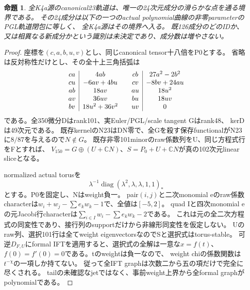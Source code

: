 \documentclass[a4paper,11pt]{ltjsarticle}
\newtheorem{proposition}{命題}[section]
\theoremstyle{definition}
\begin{document}
\begin{proposition}\label{prop:plane-concurrent-m3-K4a-smooth24-parent}
全K4a源のcanonical23軌道は、唯一の24次元成分の滑らかな点を通る境界である。
その24成分は以下の一つのactual polynomial曲線の非零parameterのPGL軌道閉包に等しく、
全K4a源はその境界へ入る。
既126成分のどのIDか、又は相異なる新成分かという識別は未決定であり、成分数は増やさない。
\end{proposition}
\begin{proof}
座標を$(c,a,b,u,v)$とし、同じcanonical tensor十八倍をP0とする。
省略は反対称性だけとし、その全十上三角括弧は
\[
\begin{array}{c|c@{\qquad}c|c}
 ca&4ab&cb&27a^2-2b^2\\
 cu&-6av+4bu&cv&-8bv+24au\\
 ab&18av&au&18u^2\\
 av&36uv&bu&18uv\\
 bv&18u^2+36v^2&uv&0
\end{array}
\]
である。全350微分Dはrank101、実Euler/PGL/scale tangent Gはrank48、
kerDは49次元である。
既存kernelのN23はDN零で、全Gを殺す保存functionalがN23に$8/87$を与えるので$N\notin G$。
既存非零101minorのraw係数列をU、同じ方程式行をFとすれば、
$V_{150}=G\oplus(U+\mathbb CN)$、$S=P_0+U+\mathbb CN$が真の102次元linear sliceとなる。

normalized actual torusを
\[
 \lambda^{-1}\operatorname{diag}(\lambda^2,\lambda,\lambda,1,1)_*
\]
とする。P0を固定し、Nはweight負一。
pair$(i,j)$と二次monomial eのraw係数characterは$w_i+w_j-\sum e_kw_k-1$で、全値は$[-5,2]$。
quad Iと四次monomial eの元Jacobi行characterは$\sum_{i\in I}w_i-\sum e_kw_k-2$である。
これは元の全二次方程式の同変性であり、接行列のsupportだけから非線形同変性を仮定しない。
Uのraw列、選択101行は全てweight eigenvectorsなのでSと選択式はtorus-stable。
可逆$D_{F,U}$にformal IFTを適用すると、選択式の全解は一意な$x=f(t)$、
$f(0)=f'(0)=0$である。tのweightは負一なので、
weight chiの係数関数は$t^{-\chi}$の一項しか持てない。
従って全IFT graphは次数二から五の項だけで完全に尽くされる。
tailの未確認なjetではなく、事前weight上界から全formal graphがpolynomialである。


\end{proof}
\end{document}
